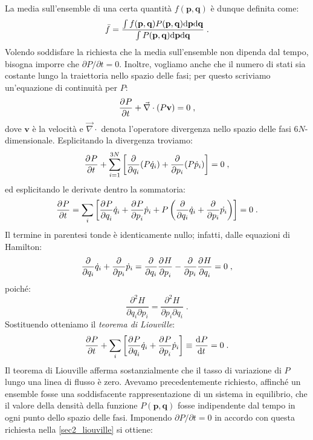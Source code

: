La media sull'ensemble di una certa quantità $f(\mathbf{p},\mathbf{q})$ è dunque definita come:
\begin{equation}
\bar{f}=\frac{\int f(\mathbf{p},\mathbf{q})P(\mathbf{p},\mathbf{q})\mathrm{d}{\mathbf{p}}\mathrm{d}{\mathbf{q}}}{\int P(\mathbf{p},\mathbf{q})\mathrm{d}{\mathbf{p}}\mathrm{d}{\mathbf{q}}}\;.
\end{equation}
Volendo soddisfare la richiesta che la media sull'ensemble non dipenda dal tempo, bisogna imporre che $\partial P/\partial t=0$. 
Inoltre, vogliamo anche che il numero di stati sia costante lungo la traiettoria nello spazio delle fasi; per questo scriviamo un'equazione di continuità per $P$:
\begin{equation}
 \frac{\partial^{}P}{\partial t^{}}+\vec{\nabla}\cdot (P\mathbf{v})=0\;,
\end{equation}
dove $\mathbf{v}$ è la velocità e $\vec{\nabla}\cdot$ denota l'operatore divergenza nello spazio delle fasi $6N$-dimensionale. Esplicitando la divergenza troviamo:
\begin{equation}
 \frac{\partial^{}P}{\partial t^{}}+\sum_{i=1}^{3N}\left[\frac{\partial}{\partial q_i}(P\dot{q}_i)+\frac{\partial}{\partial p_i}(P\dot{p}_i)\right]=0\;,
\end{equation}
ed esplicitando le derivate dentro la sommatoria:
\begin{equation}
 \frac{\partial^{}P}{\partial t^{}}=\sum_i \left[\frac{\partial^{}P}{\partial q_i^{}}\dot{q}_i+\frac{\partial^{}P}{\partial p_i^{}}\dot{p}_i+P\left(\frac{\partial}{\partial q_i}\dot{q}_i+\frac{\partial}
 {\partial p_i}\dot{p_i}\right)\right]=0\;.
\end{equation}
Il termine in parentesi tonde è identicamente nullo; infatti, dalle equazioni di Hamilton:
\begin{equation}
 \frac{\partial}{\partial q_i}\dot{q}_i+\frac{\partial}{\partial p_i}\dot{p}_i=\frac{\partial}{\partial q_i}\frac{\partial^{}H}{\partial p_i^{}}-
 \frac{\partial}{\partial p_i}\frac{\partial^{}H}{\partial q_i^{}}=0\;,
\end{equation}
poiché:
\begin{equation}
\frac{\partial^2 H}{\partial q_i\partial p_i}=\frac{\partial^2 H}{\partial p_i\partial q_i}\;.
\end{equation}
Sostituendo otteniamo il \textit{teorema di Liouville}:
\begin{equation}
 \frac{\partial^{}P}{\partial t^{}}+\sum_i \left[\frac{\partial^{}P}{\partial q_i^{}}\dot{q}_i+\frac{\partial^{}P}{\partial p_i^{}}\dot{p}_i\right]\equiv \frac{\mathrm{d}^{}P}{\mathrm{d}t^{}}=0\;. \label{sec2_liouville}
\end{equation}
Il teorema di Liouville afferma sostanzialmente che il tasso di variazione di $P$ lungo una linea di flusso è zero. Avevamo precedentemente richiesto, affinché un ensemble fosse una soddisfacente rappresentazione di un sistema in equilibrio, che il valore della densità della funzione $P(\mathbf{p},\mathbf{q})$ fosse indipendente dal tempo in ogni punto dello spazio delle fasi. Imponendo $\partial P/\partial t=0$ in accordo con questa richiesta nella \eqref{sec2_liouville} si ottiene:
